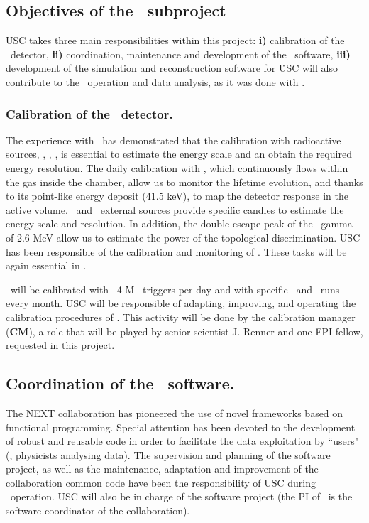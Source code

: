 \subsection{Objectives of the \sUSC\ subproject}
\label{sec.obj.usc}

\indent


USC takes three main responsibilities within this project: {\bf i)} calibration of the \Next\ detector, {\bf ii)} coordination, maintenance and development of the \Next\ software, {\bf iii)} development of the simulation and reconstruction software for \HDEMO\. USC will also contribute to the \Next\ operation and data analysis, as it was done with \NEW.

\subsubsection{Calibration of the \Next\ detector.}

The experience with \NEW\ has demonstrated that the calibration with radioactive sources, \KR, \CS, \TL, is essential to estimate the energy scale and an obtain the required energy resolution. The daily calibration with \KR, which continuously flows within the gas inside the chamber, allow us to monitor the lifetime evolution, and thanks to its point-like energy deposit (41.5 keV), to map the detector response in the active volume. \CS\ and \TL\ external sources  provide specific candles to estimate the energy scale and resolution. In addition, the double-escape peak of the \TL\ gamma of 2.6 MeV allow us to estimate the power of the topological discrimination. USC has been responsible of the calibration and monitoring of \NEW. These tasks will be again essential in \Next. 

\Next\ will be calibrated with ~4 M \KR\ triggers per day and with specific \CS\ and \TL\ runs every month. USC will be responsible of adapting, improving, and operating the calibration procedures of \Next. This activity will be done by the calibration manager ({\bf CM}), a role that will be played by senior scientist J. Renner and one FPI fellow, requested in this project. 

\subsection{Coordination of the \Next\ software.}

The NEXT collaboration has pioneered the use of novel frameworks based on functional programming. Special attention has been devoted to the development of  robust and reusable code in order to facilitate the data exploitation by ``users" (\ie, physicists analysing data). The supervision and planning of the software project, as well as the maintenance, adaptation and improvement of the collaboration common code have been the responsibility of USC during \NEW\ operation. USC will also be in charge of the software project (the PI of \sUSC\ is the software coordinator of the collaboration).  

